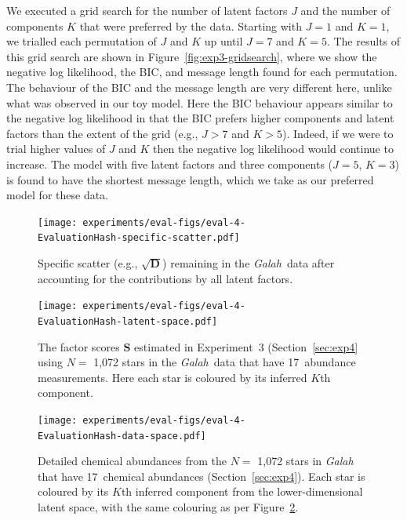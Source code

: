 \documentclass[twocolumn]{aastex62}
\newcommand{\project}[1]{\textsl{#1}}
\newcommand{\Galah}{\project{Galah}}
\newcommand{\vect}[1]{\boldsymbol{\mathbf{#1}}}
\renewcommand{\vec}[1]{\vect{#1}}
\newcommand{\factorscores}{\textbf{S}}
\newcommand{\specificvariance}{\vec{D}}
\newcommand{\NumLatentFactors}{J}
\newcommand{\NumComponents}{K}
\newcommand{\ExperimentHash}{89dab}
\newcommand{\EvaluationHash}{c7d68}
\newcommand{\ExpThreeNumAbundances}{17}
\begin{document}
We executed a grid search for the number of latent factors $\NumLatentFactors$
and the number of components $\NumComponents$ that were preferred by the data.
Starting with $\NumLatentFactors = 1$ and $\NumComponents = 1$, we trialled each
permutation of $\NumLatentFactors$ and $\NumComponents$ up until $\NumLatentFactors = 7$
and $\NumComponents = 5$. 
The results of this grid search are shown in Figure~\ref{fig:exp3-gridsearch},
where we show the negative log likelihood, the BIC, and message length found for each permutation.
The behaviour of the BIC and the message length are very different here, unlike what was observed
in our toy model. Here the BIC behaviour appears similar to the negative log likelihood in that the BIC
prefers higher components and latent factors than the extent of the grid (e.g., $J > 7$ and $K > 5$). Indeed, if we were to trial higher values of $J$ and $K$ then the negative log likelihood would continue to increase.
The model with five latent factors and three components ($J = 5$, $K = 3$) is found to have the shortest message length, which we take as our preferred model for these data.



\begin{figure}
	\texttt{[image: experiments/eval-figs/eval-4-\\EvaluationHash-specific-scatter.pdf]}
	\caption{Specific scatter (e.g., $\sqrt{\specificvariance}$) remaining in the \Galah\ data \citep{Buder:2018}
			 after accounting for the contributions by all
			 latent factors.}
    \label{fig:exp3-specific-scatter}
\end{figure}




\begin{figure}
	\texttt{[image: experiments/eval-figs/eval-4-\\EvaluationHash-latent-space.pdf]}
	\caption{The factor scores $\factorscores$ estimated in Experiment~3 (Section~\ref{sec:exp4} using $N =$ 1,072 stars in the \Galah\ data \citep{Buder:2018} that have \ExpThreeNumAbundances\ abundance measurements. Here each star is coloured by its inferred $K$th component.}
    \label{fig:exp3-latent-space}
\end{figure}


\begin{figure}
	\texttt{[image: experiments/eval-figs/eval-4-\\EvaluationHash-data-space.pdf]}
	\caption{Detailed chemical abundances from the $N =$ 1,072 stars in \Galah\ \citep{Buder:2018} that have \ExpThreeNumAbundances\ chemical abundances (Section~\ref{sec:exp4}). Each star is coloured by its $K$th inferred component from the lower-dimensional latent space, with the same colouring as per Figure~\ref{fig:exp3-latent-space}.}
    \label{fig:exp3-data-space}
\end{figure}
\end{document}
